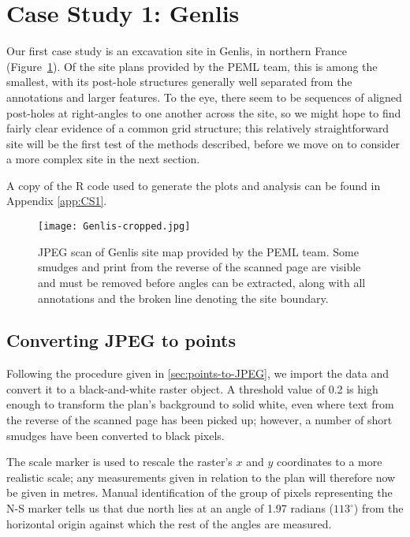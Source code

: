 \documentclass[../../ArchStats.tex]{subfiles}
\begin{document}
\section{Case Study 1: Genlis}
\label{sec:CS1}

Our first case study is an excavation site in Genlis, in northern France (Figure~\ref{fig:Genlis-JPEG}). Of the site plans provided by the PEML team, this is among the smallest, with its post-hole structures generally well separated from the annotations and larger features.  To the eye, there seem to be sequences of aligned post-holes at right-angles to one another across the site, so we might hope to find fairly clear evidence of a common grid structure; this relatively straightforward site will be the first test of the methods described,  before we move on to consider a more complex site in the next section.

A copy of the R code used to generate the plots and analysis can be found in Appendix \ref{app:CS1}.

\begin{figure}[!h]
\centering
\caption{JPEG scan of Genlis site map provided by the PEML team. Some smudges and print from the reverse of the scanned page are visible and must be removed before angles can be extracted, along with all annotations and the broken line denoting the site boundary.}
\label{fig:Genlis-JPEG}
\texttt{[image: Genlis-cropped.jpg]}
\end{figure}


\subsection{Converting JPEG to points}

Following the procedure given in \ref{sec:points-to-JPEG}, we import the data and convert it to a black-and-white raster object. A threshold value of 0.2 is high enough to transform the plan's background to solid white, even where text from the reverse of the scanned page has been picked up; however, a number of short smudges have been converted to black pixels.

The scale marker is used to rescale the raster's $x$ and $y$ coordinates to a more realistic scale; any measurements given in relation to the plan will therefore now be given in metres. Manual identification of the group of pixels representing the N-S marker tells us that due north lies at an angle of 1.97 radians ($113^\circ$) from the horizontal origin against which the rest of the angles are measured.
\end{document}
